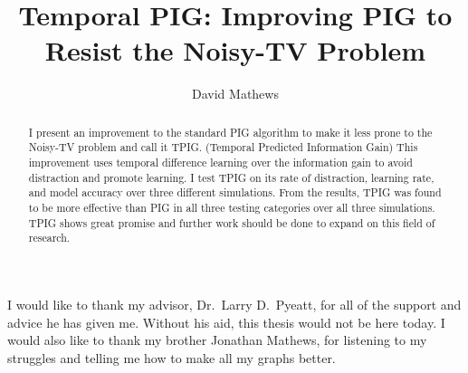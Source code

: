 \documentclass[12pt]{thesis}
\title{Temporal PIG: Improving PIG to Resist the Noisy-TV Problem}
\author{David Mathews}
\begin{document}
\maketitle

\makecopyright %

\preliminaries

\begin{abstract}
I present an improvement to the standard PIG algorithm to make it less prone to the Noisy-TV problem and call it TPIG. (Temporal Predicted Information Gain) This improvement uses temporal difference learning over the information gain to avoid distraction and promote learning. I test TPIG on its rate of distraction, learning rate, and model accuracy over three different simulations. From the results, TPIG was found to be more effective than PIG in all three testing categories over all three simulations. TPIG shows great promise and further work should be done to expand on this field of research.
\end{abstract}

\begin{acknowledgments}
  I would like to thank my advisor, Dr.\ Larry D.\ Pyeatt, for all of the support and advice he has given me. Without his aid, this thesis would not be here today. I would also like to thank my brother Jonathan Mathews, for listening to my struggles and telling me how to make all my graphs better.
\end{acknowledgments}


\tableofcontents


\listoffigures



\end{document}
